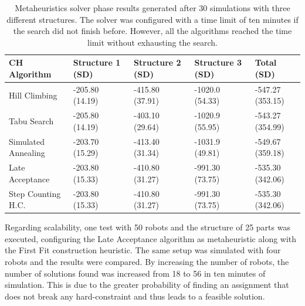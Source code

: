 \documentclass[letterpaper, 10 pt, conference]{ieeeconf}  %
\begin{document}
\begin{table}
		\caption{Metaheuristics solver phase results generated after 30 simulations with three different structures. The solver was configured with a time limit of ten minutes if the search did not finish before. However, all the algorithms reached the time limit without exhausting the search. }
		\begin{tabular}{ | l | p{1cm} | p{1cm} | p{1cm} | p{1cm} |}
	\hline
         CH Algorithm & Structure 1 (SD) & Structure 2 (SD) & Structure 3 (SD) & Total (SD)\\ \hline
         Hill Climbing & -205.80 (14.19) & -415.80 (37.91) & -1020.0 (54.33) & -547.27 (353.15) \\ \hline
         Tabu Search & -205.80 (14.19) & -403.10 (29.64) & -1020.9 (55.95) & -543.27 (354.99) \\ \hline
         Simulated Annealing & -203.70 (15.29) & -413.40 (31.34) & -1031.9 (49.81) & -549.67 (359.18) \\ \hline
         Late Acceptance & -203.80 (15.33) & -410.80 (31.27) & -991.30 (73.75) & -535.30 (342.06) \\ \hline
         Step Counting H.C. & -203.80 (15.33) & -410.80 (31.27) & -991.30 (73.75) & -535.30 (342.06) \\ \hline         		\end{tabular}
	\label{table:LS_score}
\end{table}

Regarding scalability, one test with 50 robots and the structure of 25 parts was executed, configuring the Late Acceptance algorithm as metaheuristic along with the First Fit construction heuristic. The same setup was simulated with four robots and the results were compared. By increasing the number of robots, the number of solutions found was increased from 18 to 56 in ten minutes of simulation. This is due to the greater probability of finding an assignment that does not break any hard-constraint and thus leads to a feasible solution.

 
\end{document}
